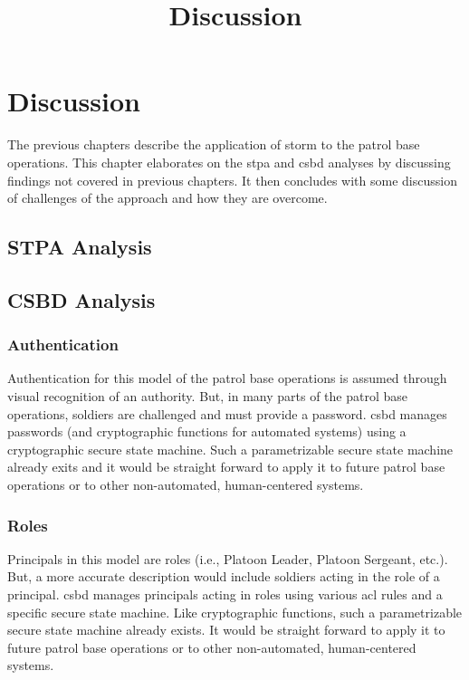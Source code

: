 \documentclass[../../main/main.tex]{subfiles}
\begin{document}
\title{Discussion}

\chapter{Discussion}\label{chp:discussion}
The previous chapters describe the application of \gls{storm} to the patrol base operations.  This chapter elaborates on the \gls{stpa} and \gls{csbd} analyses by discussing findings not covered in previous chapters.   It then concludes with some discussion of challenges of the approach and how they are overcome.


\section{STPA Analysis}\label{sec:stpadiscussion}

\section{CSBD Analysis}\label{sec:csbddiscussion}

\subsection{Authentication}
Authentication for this model of the patrol base operations is assumed through visual recognition of an authority.  But, in many parts of the patrol base operations, soldiers are challenged and must provide a password.  \gls{csbd} manages passwords (and cryptographic functions for automated systems) using a cryptographic secure state machine.  Such a parametrizable secure state machine already exits and it would be straight forward to apply it to future patrol base operations or to other non-automated, human-centered systems.

\subsection{Roles}
Principals in this model are roles (i.e., Platoon Leader, Platoon Sergeant, etc.).  But, a more accurate description would include soldiers acting in the role of a principal.  \gls{csbd} manages principals acting in roles using various \gls{acl} rules and a specific secure state machine.  Like cryptographic functions, such a parametrizable secure state machine already exists.  It would be straight forward to apply it to future patrol base operations or to other non-automated, human-centered systems.
\end{document}

